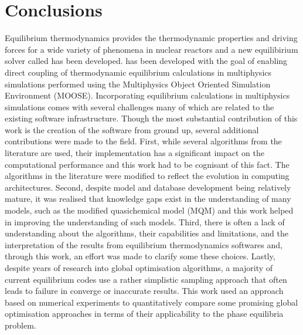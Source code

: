 \chapter{Conclusions} \label{chap:conclusions}

	Equilibrium thermodynamics provides the thermodynamic properties and driving forces for a wide variety of phenomena in nuclear reactors and a new equilibirium solver called {\GEM} has been developed. {\GEM} has been developed with the goal of enabling direct coupling of thermodynamic equilibrium calculations in multiphysics simulations performed using the Multiphysics Object Oriented Simulation Environment (MOOSE). Incorporating equilibrium calculations in multiphysics simulations comes with several challenges many of which are related to the existing software infrastructure. Though the most substantial contribution of this work is the creation of the software from ground up, several additional contributions were made to the field. First, while several algorithms from the literature are used, their implementation has a significant impact on the computational performance and this work had to be cognisant of this fact. The algorithms in the literature were modified to reflect the evolution in computing architectures. Second, despite model and database development being relatively mature, it was realised that knowledge gaps exist in the understanding of many models, such as the modified quasichemical model (MQM) and this work helped in improving the understanding of such models. Third, there is often a lack of understanding about the algorithms, their capabilities and limitations, and the interpretation of the results from equilibrium thermodynamics softwares and, through this work, an effort was made to clarify some these choices. Lastly, despite years of research into global optimisation algorithms, a majority of current equilibrium codes use a rather simplistic sampling approach that often leads to failure in converge or inaccurate results. This work used an approach based on numerical experiments to quantitatively compare some promising global optimisation approaches in terms of their applicability to the phase equilibria problem. 

